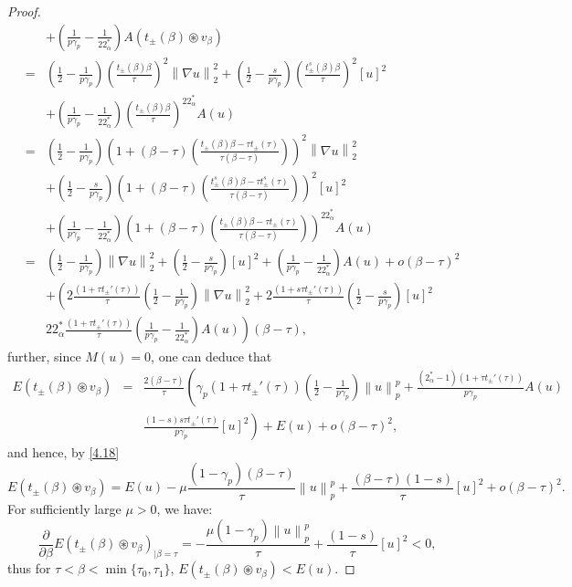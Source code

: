 \documentclass[11pt]{article}
\numberwithin{equation}{section}
\numberwithin{mytheorem}{section}
\begin{document}
\begin{proof}
\begin{eqnarray*}
				&& +\left(\frac{1}{p\gamma_p}-\frac{1}{22^*_{\alpha}}\right)A(t_{\pm}(\beta)\circledast v_{\beta})\\
				& = & \left(\frac{1}{2}-\frac{1}{p\gamma_p}\right)\left(\frac{t_{\pm}(\beta)\beta}{\tau}\right)^2\left\| \nabla u \right\|_2^2+\left(\frac{1}{2}-\frac{s}{p\gamma_p}\right)\left(\frac{t_{\pm}^{s}(\beta)\beta}{\tau}\right)^2[u]^2\\
				&& +\left(\frac{1}{p\gamma_p}-\frac{1}{22^*_{\alpha}}\right)\left(\frac{t_{\pm}(\beta)\beta}{\tau}\right)^{22^*_{\alpha}}A(u)\\
				&= &  \left(\frac{1}{2}-\frac{1}{p\gamma_p}\right)\left(1+(\beta-\tau)\left(\frac{t_{\pm}(\beta)\beta-\tau t_{\pm}(\tau)}{\tau(\beta-\tau)}\right)\right)^2\left\| \nabla u \right\|_2^2\\
				&& +\left(\frac{1}{2}-\frac{s}{p\gamma_p}\right)\left(1+(\beta-\tau)\left(\frac{t_{\pm}^s(\beta)\beta-\tau t_{\pm}^s(\tau)}{\tau(\beta-\tau)}\right)\right)^2[u]^2\\
				&& +\left(\frac{1}{p\gamma_p}-\frac{1}{22^*_{\alpha}}\right)\left(1+(\beta-\tau)\left(\frac{t_{\pm}(\beta)\beta-\tau t_{\pm}(\tau)}{\tau(\beta-\tau)}\right)\right)^{22^*_{\alpha}}A(u)\\
				& = & \left(\frac{1}{2}-\frac{1}{p\gamma_p}\right)\left\| \nabla u \right\|_2^2+\left(\frac{1}{2}-\frac{s}{p\gamma_p}\right)[u]^2+\left(\frac{1}{p\gamma_p}-\frac{1}{22^*_{\alpha}}\right)A(u) +o(\beta-\tau)^2\\
				&& +\left(2\frac{(1+\tau t_{\pm}'(\tau))}{\tau}\left(\frac{1}{2}-\frac{1}{p\gamma_p}\right)\left\| \nabla u \right\|_2^2+2\frac{(1+s\tau t_{\pm}'(\tau))}{\tau}\left(\frac{1}{2}-\frac{s}{p\gamma_p}\right) [u]^2\right.\\
				&& \left. 22^*_{\alpha}\frac{(1+\tau t_{\pm}'(\tau))}{\tau}\left(\frac{1}{p\gamma_p}-\frac{1}{22^*_{\alpha}}\right)A(u)\right)(\beta-\tau),
			\end{eqnarray*}
			further, since $M(u)=0$, one can deduce that
			\begin{eqnarray*}
				E(t_{\pm}(\beta)\circledast v_{\beta}) & = & \frac{2(\beta-\tau)}{\tau}\left(\gamma_p(1+\tau t_{\pm}'(\tau))\left(\frac{1}{2}-\frac{1}{p\gamma_p}\right)\left\| u \right\|_p^p+ \frac{(2^*_{\alpha}-1)(1+\tau t_{\pm}'(\tau))}{p\gamma_p}A(u)\right.\\
				&& \left. \frac{(1-s)s\tau t_{\pm}'(\tau)}{p\gamma_p}[u]^2\right)+ E(u)  +o(\beta-\tau)^2,
			\end{eqnarray*}
			and hence, by \eqref{4.18}
			$$E(t_{\pm}(\beta)\circledast v_{\beta}) = E(u)-\mu \frac{(1-\gamma_p)(\beta-\tau)}{\tau}\left\| u \right\|_p^p+\frac{(\beta-\tau)(1-s)}{\tau}[u]^2+o(\beta-\tau)^2.$$
			For sufficiently large $\mu>0$, we have:
			$$\frac{\partial}{\partial\beta}E(t_{\pm}(\beta)\circledast v_{\beta})_{|\beta=\tau}=-\frac{\mu (1-\gamma_p)\left\| u \right\|_p^p}{\tau}+\frac{(1-s)}{\tau}[u]^2<0,$$
			thus for $\tau<\beta<\min\{\tau_0,\tau_1\}$, $E(t_{\pm}(\beta)\circledast v_{\beta})<E(u)$.
		\end{proof}
\end{document}
